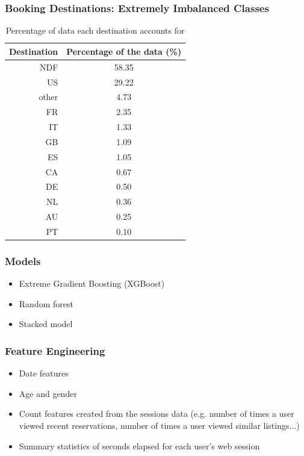 \documentclass{beamer}
\begin{document}
\begin{frame}
\frametitle{Booking Destinations: Extremely Imbalanced Classes}
\begin{table}[ht]
\centering
\begin{tabular}{| r |c |}
  \hline
  \textbf{Destination} & \textbf{Percentage of the data (\%)} \\ 
  \hline
  NDF & 58.35 \\ 
  US & 29.22 \\ 
  other & 4.73 \\ 
  FR & 2.35 \\ 
  IT & 1.33 \\ 
  GB & 1.09 \\ 
  ES & 1.05 \\ 
  CA & 0.67 \\ 
  DE & 0.50 \\ 
  NL & 0.36 \\ 
  AU & 0.25 \\ 
  PT & 0.10 \\ 
   \hline
\end{tabular}
\caption{Percentage of data each destination accounts for}
\label{table:countries}
\end{table}
\end{frame}

\begin{frame}
\frametitle{Models}
  \begin{itemize}
    \item Extreme Gradient Boosting (XGBoost)
    \item Random forest
    \item Stacked model
  \end{itemize}
\end{frame}

\begin{frame}
\frametitle{Feature Engineering}
\begin{itemize}
  \item Date features
  \item Age and gender
  \item Count features created from the sessions data (e.g. number of times a user viewed recent reservations, number of times a user viewed similar listings...)
  \item Summary statistics of seconds elapsed for each user’s web session
\end{itemize}
\end{frame}
\end{document}
